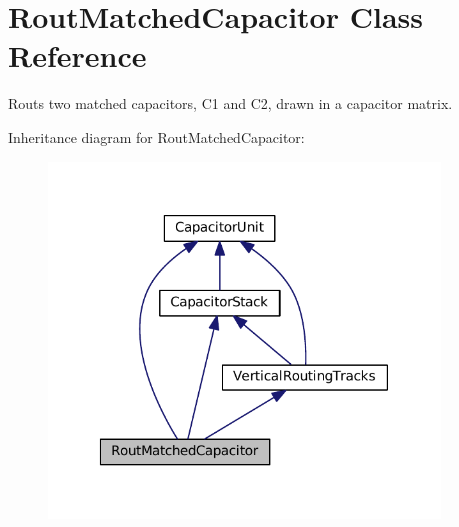 \hypertarget{classpython_1_1capacitorrouted_1_1RoutMatchedCapacitor}{}\section{Rout\+Matched\+Capacitor Class Reference}
\label{classpython_1_1capacitorrouted_1_1RoutMatchedCapacitor}


Routs two matched capacitors, C1 and C2, drawn in a capacitor matrix.  




Inheritance diagram for Rout\+Matched\+Capacitor\+:
\nopagebreak
\begin{figure}[H]
\begin{center}
\leavevmode
\includegraphics[width=295pt]{classpython_1_1capacitorrouted_1_1RoutMatchedCapacitor__inherit__graph}
\end{center}
\end{figure}
